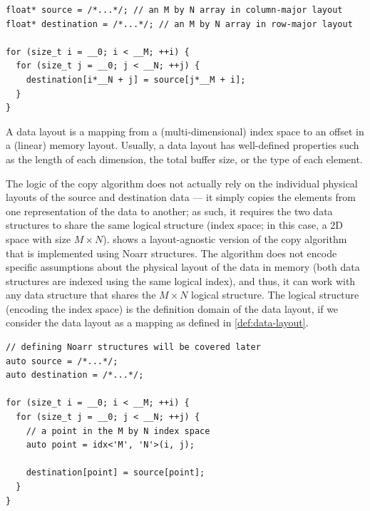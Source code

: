 \begin{lstlisting}[style=C++, caption={A non-layout-agnostic copy algorithm in \cpp.}, label={lst:non-agnostic-copy}]
float* source = /*...*/; // an M by N array in column-major layout
float* destination = /*...*/; // an M by N array in row-major layout

for (size_t i = __0; i < __M; ++i) {
  for (size_t j = __0; j < __N; ++j) {
    destination[i*__N + j] = source[j*__M + i];
  }
}
\end{lstlisting}

\begin{defn}\label{def:data-layout} A data layout is a mapping from a (multi-dimensional) index space to an offset in a (linear) memory layout. Usually, a data layout has well-defined properties such as the length of each dimension,
the total buffer size, or the type of each element.
\end{defn}

The logic of the copy algorithm does not actually rely on the individual physical layouts of the source and destination data --- it simply copies the elements from one representation of the data to another; as such, it requires the two data structures to share the same logical structure (index space; in this case, a 2D space with size $M \times N$).  shows a layout-agnostic version of the copy algorithm that is implemented using Noarr structures. The algorithm does not encode specific assumptions about the physical layout of the data in memory (both data structures are indexed using the same logical index), and thus, it can work with any data structure that shares the $M \times N$ logical structure. The logical structure (encoding the index space) is the definition domain of the data layout, if we consider the data layout as a mapping as defined in \cref{def:data-layout}.

\begin{lstlisting}[style=C++, caption={A layout-agnostic copy algorithm using Noarr structures.}, label={lst:layout-agnostic-copy}]
// defining Noarr structures will be covered later
auto source = /*...*/;
auto destination = /*...*/;

for (size_t i = __0; i < __M; ++i) {
  for (size_t j = __0; j < __N; ++j) {
    // a point in the M by N index space
    auto point = idx<'M', 'N'>(i, j);

    destination[point] = source[point];
  }
}
\end{lstlisting}


